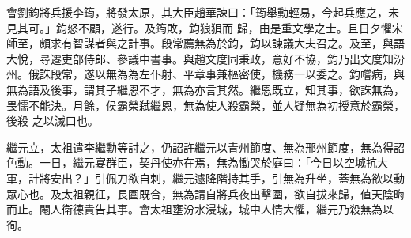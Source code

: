 \begin{pinyinscope}
 會劉鈞將兵援李筠，將發太原，其大臣趙華諫曰：「筠舉動輕易，今起兵應之，未見其可。」鈞怒不顧，遂行。及筠敗，鈞狼狽而
 歸，由是重文學之士。且日夕懼宋師至，頗求有智謀者與之計事。段常薦無為於鈞，鈞以諫議大夫召之。及至，與語大悅，尋遷吏部侍郎、參議中書事。與趙文度同秉政，意好不協，鈞乃出文度知汾州。俄誅段常，遂以無為為左仆射、平章事兼樞密使，機務一以委之。鈞嚐病，與無為語及後事，謂其子繼恩不才，無為亦言其然。繼恩既立，知其事，欲誅無為，畏懦不能決。月餘，侯霸榮弑繼恩，無為使人殺霸榮，並人疑無為初授意於霸榮，後殺
 之以滅口也。



 繼元立，太祖遣李繼勳等討之，仍詔許繼元以青州節度、無為邢州節度，無為得詔色動。一日，繼元宴群臣，契丹使亦在焉，無為慟哭於庭曰：「今日以空城抗大軍，計將安出？」引佩刀欲自刺，繼元遽降階持其手，引無為升坐，蓋無為欲以動眾心也。及太祖親征，長圍既合，無為請自將兵夜出擊圍，欲自拔來歸，值天陰晦而止。閹人衛德貴告其事。會太祖壅汾水浸城，城中人情大懼，繼元乃殺無為以徇。



\end{pinyinscope}